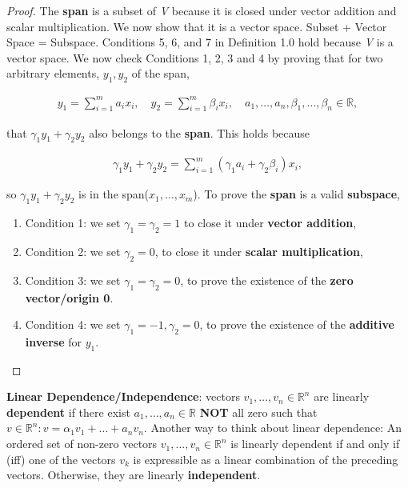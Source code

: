 \documentclass[12pt]{article}
\newenvironment{definition}[2][Definition]{\begin{trivlist}
\item[\hskip \labelsep {\bfseries #1}\hskip \labelsep {\bfseries #2}]}{\end{trivlist}}
\begin{document}
\begin{proof}
The \textbf{span} is a subset of \emph{V} because it is closed under vector addition and scalar multiplication. We now show that it is a vector space. Subset + Vector Space = Subspace.  Conditions 5, 6, and 7 in Definition 1.0 hold because \emph{V} is a vector space. We now check Conditions 1, 2, 3 and 4 by proving that for two arbitrary elements, \(y_1,y_2\)  of the span,

\begin{equation}
\begin{split}
y_1 = \sum_{i=1}^{m}a_i x_i, \quad y_2 = \sum_{i=1}^{m}\beta_i x_i, \quad a_1,\dots,a_n,\beta_1,\dots,\beta_n  \in \mathbb{R},
\end{split}
\end{equation}

that \(\gamma_1 y_1 + \gamma_2 y_2\) also belongs to the \textbf{span}. This holds because

\begin{equation}
\begin{split}
\gamma_1 y_1 + \gamma_2 y_2 = \sum_{i=1}^{m}(\gamma_1 a_i + \gamma_2 \beta_i)x_i,
\end{split}
\end{equation}

\noindent
so \(\gamma_1 y_1 + \gamma_2 y_2\) is in the span(\(x_1,\dots,x_m\)). To prove the \textbf{span} is a valid \textbf{subspace},

\begin{enumerate}
    \item Condition 1: we set \(\gamma_1 = \gamma_2 = 1\) to close it under \textbf{vector addition},
    \item Condition 2: we set \(\gamma_2 = 0\), to close it under \textbf{scalar multiplication},
    \item Condition 3: we set \(\gamma_1 = \gamma_2 = 0\), to prove the existence of the \textbf{zero vector/origin 0}.
    \item Condition 4: we set \(\gamma_1 = -1, \gamma_2 = 0\), to prove the existence of the \textbf{additive inverse} for \(y_1\).
\end{enumerate}
\end{proof}

\begin{definition}{1.3} \textbf{Linear Dependence/Independence}: vectors \(v_1,\dots, v_n \in \mathbb{R}^n\) are linearly \textbf{dependent} if there exist \(a_1,\dots,a_n \in \mathbb{R}\) \textbf{NOT} all zero such that 
\(v \in \mathbb{R}^n : v=\alpha_1 v_1 + \dots + a_n v_n\). Another way to think about linear dependence: An ordered set of non-zero vectors \(v_1,\dots, v_n \in \mathbb{R}^n\) is linearly dependent if and only if (iff) one of the vectors \(v_k\) is expressible as a linear combination of the preceding vectors. Otherwise, they are linearly \textbf{independent}.
\end{definition}
\end{document}
